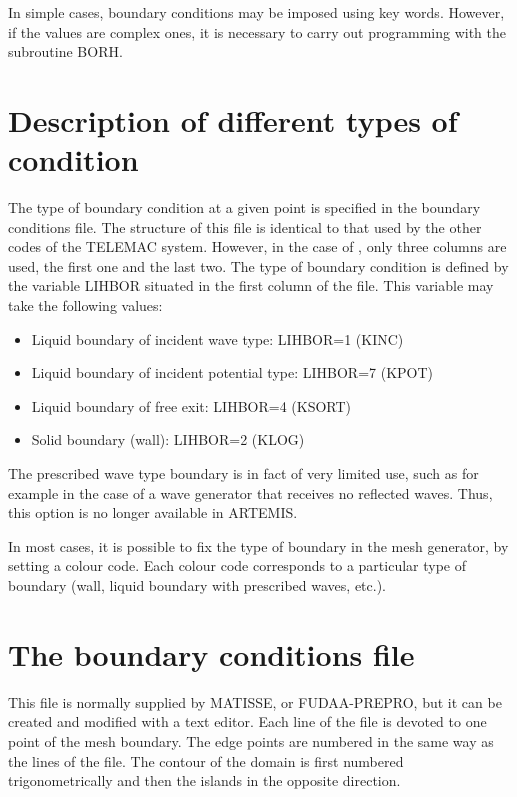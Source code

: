 In simple cases, boundary conditions may be imposed using key words. However,
if the values are complex ones, it is necessary to carry out programming with
the subroutine BORH.


\section{Description of different types of condition}

The type of boundary condition at a given point is specified in the boundary
conditions file. The structure of this file is identical to that used by the
other codes of the TELEMAC system. However, in the case of \artemis{}, only
three columns are used, the first one and the last two. The type of boundary
condition is defined by the variable LIHBOR situated in the first column of the
file. This variable may take the following values:

\begin{itemize}
\item  Liquid boundary of incident wave type: LIHBOR=1 (KINC)

\item  Liquid boundary of incident potential type: LIHBOR=7 (KPOT)

\item  Liquid boundary of free exit: LIHBOR=4 (KSORT)

\item  Solid boundary (wall): LIHBOR=2 (KLOG)
\end{itemize}

The prescribed wave type boundary is in fact of very limited use, such as for
example in the case of a wave generator that receives no reflected waves. Thus,
this option is no longer available in ARTEMIS.

In most cases, it is possible to fix the type of boundary in the mesh
generator, by setting a colour code. Each colour code corresponds to a
particular type of boundary (wall, liquid boundary with prescribed waves,
etc.).


\section{The boundary conditions file}

This file is normally supplied by MATISSE, \stbtel{} or FUDAA-PREPRO, but it
can be created and modified with a text editor. Each line of the file is
devoted to one point of the mesh boundary. The edge points are numbered in the
same way as the lines of the file. The contour of the domain is first numbered
trigonometrically and then the islands in the opposite direction.

